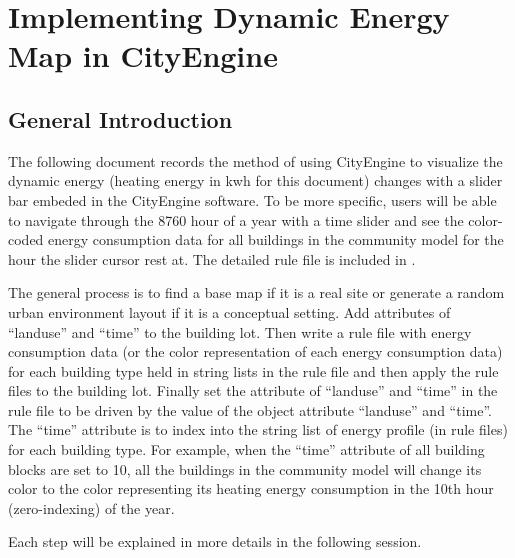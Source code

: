 \chapter{Implementing Dynamic Energy Map in
  CityEngine} %

\label{AppendixA} %

\section{General Introduction}
The following document records the method of using CityEngine to
visualize the dynamic energy (heating energy in kwh for this document)
changes with a slider bar embeded in the CityEngine software. To be
more specific, users will be able to navigate through the 8760 hour of
a year with a time slider and see the color-coded energy consumption
data for all buildings in the community model for the hour the slider
cursor rest at. The detailed rule file is included in .

The general process is to find a base map if it is a real site or
generate a random urban environment layout if it is a conceptual
setting. Add attributes of ``landuse'' and ``time'' to the building
lot. Then write a rule file with energy consumption data (or the color
representation of each energy consumption data) for each building type
held in string lists in the rule file and then apply the rule files to
the building lot. Finally set the attribute of ``landuse'' and
``time'' in the rule file to be driven by the value of the object
attribute ``landuse'' and ``time''. The ``time'' attribute is to index
into the string list of energy profile (in rule files) for each
building type. For example, when the ``time'' attribute of all building
blocks are set to 10, all the buildings in the community model will
change its color to the color representing its heating energy
consumption in the 10th hour (zero-indexing) of the year.

Each step will be explained in more details in the following session.
